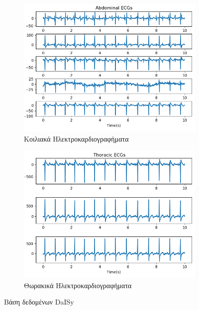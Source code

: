 \begin{figure}[H]
    \centering
    \begin{subfigure}[b]{0.48 \textwidth}
        \centering
       \includegraphics[width=\textwidth]{daisy/Abdominals.png}\en
        \caption{\gr Κοιλιακά Ηλεκτροκαρδιογραφήματα} \gr
    \end{subfigure}
    \hfill
    \begin{subfigure}[b]{0.48 \textwidth}
        \centering
        \includegraphics[width=\textwidth]{daisy/Thoracic.png}\en
        \caption{\gr Θωρακικά Ηλεκτροκαρδιογραφήματα} \gr
    \end{subfigure}
    \gr
    \caption{Βάση δεδομένων \en DaISy \gr}
    \label{fig:5.27}
\end{figure}
